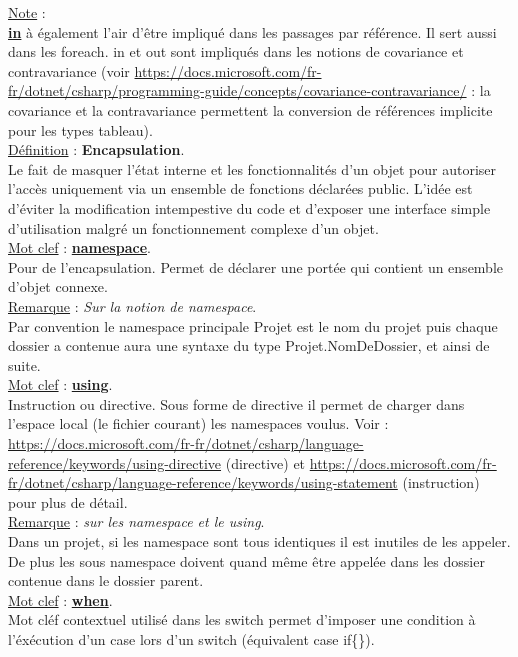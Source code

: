 \documentclass[a4paper,12pt,twoside]{article}
\newcommand{\urlcolor}{magenta}  %
\newcommand{\keycolor}{purple} %
\newcommand{\incode}[1]{{\footnotesize\ttfamily #1}} %
\newcommand{\rem}[2]{\noindent\underline{Remarque} : \textit{#1}.\\ \indent #2}
\newcommand{\note}[1]{\noindent\underline{Note} : \\ \indent #1}
\newcommand{\defi}[2]{\noindent\underline{Définition} : \textbf{#1}.\\ \indent #2}
\newcommand{\keyref}[2]{\hypersetup{urlcolor=\keycolor} \href{#1}{\textbf{#2}}\hypersetup{urlcolor=\urlcolor}}
\newcommand{\keyword}[3]{\noindent\underline{Mot clef} : \keyref{#1}{#2}. \\ \indent #3}
\begin{document}
\note{\keyref{https://docs.microsoft.com/fr-fr/dotnet/csharp/language-reference/keywords/in-generic-modifier}{in} à également l'air d'être impliqué dans les passages par référence. Il sert aussi dans les \incode{foreach}. \incode{in} et \incode{out} sont impliqués dans les notions de covariance et contravariance (voir \url{https://docs.microsoft.com/fr-fr/dotnet/csharp/programming-guide/concepts/covariance-contravariance/} : la covariance et la contravariance permettent la conversion de références implicite pour les types tableau).}\\

\defi{Encapsulation}{Le fait de masquer l'état interne et les fonctionnalités d'un objet pour autoriser l'accès uniquement via un ensemble de fonctions déclarées \incode{public}. L'idée est d'éviter la modification intempestive du code et d'exposer une interface simple d'utilisation malgré un fonctionnement complexe d'un objet.}\\

\keyword{https://docs.microsoft.com/fr-fr/dotnet/csharp/language-reference/keywords/namespace}{namespace}{Pour de l'encapsulation. Permet de déclarer une portée qui contient un ensemble d'objet connexe.}\\

\rem{Sur la notion de \incode{namespace}}{Par convention le namespace principale \incode{Projet} est le nom du projet puis chaque dossier a contenue aura une syntaxe du type \incode{Projet.NomDeDossier}, et ainsi de suite.}\\

\keyword{https://docs.microsoft.com/fr-fr/dotnet/csharp/language-reference/keywords/using}{using}{Instruction ou directive. Sous forme de directive il permet de charger dans l'espace local (le fichier courant) les namespaces voulus. Voir : \url{https://docs.microsoft.com/fr-fr/dotnet/csharp/language-reference/keywords/using-directive} (directive) et \url{https://docs.microsoft.com/fr-fr/dotnet/csharp/language-reference/keywords/using-statement} (instruction) pour plus de détail.}\\

\rem{sur les namespace et le using}{Dans un projet, si les namespace sont tous identiques il est inutiles de les appeler. De plus les sous namespace doivent quand même être appelée dans les dossier contenue dans le dossier parent.}\\

\keyword{https://docs.microsoft.com/fr-fr/dotnet/csharp/language-reference/keywords/when}{when}{Mot cléf contextuel utilisé dans les \incode{switch} permet d'imposer une condition à l'éxécution d'un case lors d'un switch (équivalent case {\incode{if\{\}}}).}\\
\end{document}
